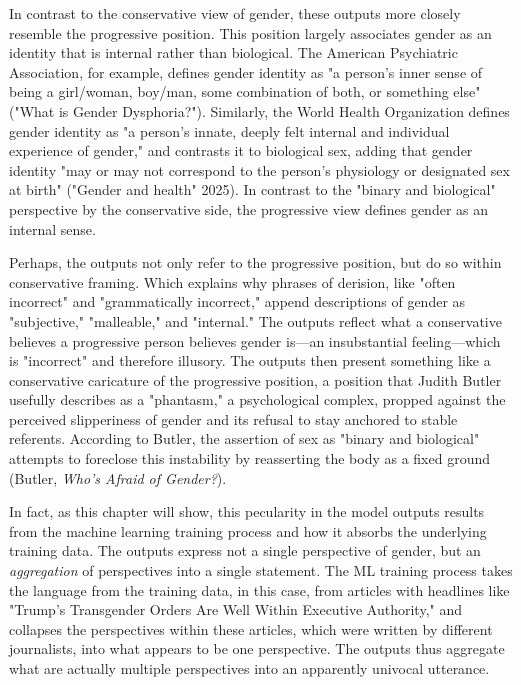 \documentclass[11pt]{article}
\begin{document}
In contrast to the conservative view of gender, these outputs more
closely resemble the progressive position. This position largely
associates gender as an identity that is internal rather than
biological. The American Psychiatric Association, for example, defines
gender identity as "a person's inner sense of being a girl/woman,
boy/man, some combination of both, or something else" ("What is Gender
Dysphoria?"). Similarly, the World Health Organization defines gender
identity as "a person's innate, deeply felt internal and individual
experience of gender," and contrasts it to biological sex, adding that
gender identity "may or may not correspond to the person's physiology
or designated sex at birth" ("Gender and health" 2025). In contrast to
the "binary and biological" perspective by the conservative side, the
progressive view defines gender as an internal sense.

Perhaps, the outputs not only refer to the progressive position, but
do so within conservative framing. Which explains why phrases of
derision, like "often incorrect" and "grammatically incorrect," append
descriptions of gender as "subjective," "malleable," and "internal."
The outputs reflect what a conservative believes a progressive person
believes gender is---an insubstantial feeling---which is "incorrect"
and therefore illusory. The outputs then present something like a
conservative caricature of the progressive position, a position that
Judith Butler usefully describes as a "phantasm," a psychological
complex, propped against the perceived slipperiness of gender and its
refusal to stay anchored to stable referents. According to Butler, the
assertion of sex as "binary and biological" attempts to foreclose this
instability by reasserting the body as a fixed ground (Butler, \emph{Who's
Afraid of Gender?}).

In fact, as this chapter will show, this pecularity in the model
outputs results from the machine learning training process and how it
absorbs the underlying training data. The outputs express not a single
perspective of gender, but an \emph{aggregation} of perspectives into a
single statement. The ML training process takes the language from the
training data, in this case, from articles with headlines like
"Trump’s Transgender Orders Are Well Within Executive Authority," and
collapses the perspectives within these articles, which were written
by different journalists, into what appears to be one perspective. The
outputs thus aggregate what are actually multiple perspectives into an
apparently univocal utterance.
\end{document}

